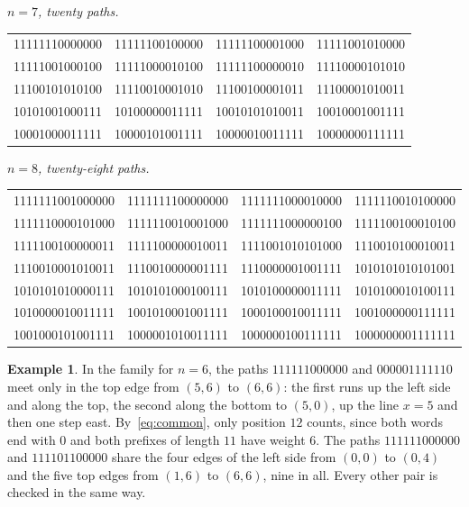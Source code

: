 \documentclass[11pt]{amsart}
\theoremstyle{definition}
\newtheorem{example}[theorem]{Example}
\theoremstyle{remark}
\numberwithin{equation}{section}
\begin{document}
\medskip\noindent\emph{$n=7$, twenty paths.}
\begin{center}\small\ttfamily
\begin{tabular}{llll}
11111110000000 & 11111100100000 & 11111100001000 & 11111001010000 \\
11111001000100 & 11111000010100 & 11111100000010 & 11110000101010 \\
11100101010100 & 11110010001010 & 11100100001011 & 11100001010011 \\
10101001000111 & 10100000011111 & 10010101010011 & 10010001001111 \\
10001000011111 & 10000101001111 & 10000010011111 & 10000000111111 \\
\end{tabular}
\end{center}

\medskip\noindent\emph{$n=8$, twenty-eight paths.}
\begin{center}\small\ttfamily
\begin{tabular}{llll}
1111111001000000 & 1111111100000000 & 1111111000010000 & 1111110010100000 \\
1111110000101000 & 1111110010001000 & 1111111000000100 & 1111100100010100 \\
1111100100000011 & 1111100000010011 & 1111001010101000 & 1110010100010011 \\
1110010001010011 & 1110010000001111 & 1110000001001111 & 1010101010101001 \\
1010101010000111 & 1010101000100111 & 1010100000011111 & 1010100010100111 \\
1010000010011111 & 1001010001001111 & 1000100010011111 & 1001000000111111 \\
1001000101001111 & 1000001010011111 & 1000000100111111 & 1000000001111111 \\
\end{tabular}
\end{center}

\begin{example}\label{ex:check}
In the family for $n=6$, the paths $111111000000$ and $000001111110$ meet only in the top edge from $(5,6)$ to $(6,6)$: the first runs up the left side and along the top, the second along the bottom to $(5,0)$, up the line $x=5$ and then one step east. By~\eqref{eq:common}, only position $12$ counts, since both words end with $0$ and both prefixes of length $11$ have weight $6$. The paths $111111000000$ and $111101100000$ share the four edges of the left side from $(0,0)$ to $(0,4)$ and the five top edges from $(1,6)$ to $(6,6)$, nine in all. Every other pair is checked in the same way.
\end{example}
\end{document}
